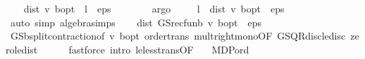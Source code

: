 \begin{isabellebody}
\ \ \isamarkupfalse%
\ {\isachardoublequoteopen}dist\ v\ {\isasymnu}\isactrlsub b{\isacharunderscore}{\kern0pt}opt\ {\isacharasterisk}{\kern0pt}\ l\ {\isacharless}{\kern0pt}\ eps\ {\isacharslash}{\kern0pt}\ {}{\isachardoublequoteclose}\isanewline
\ \ \ \ \isamarkupfalse%
\ argo\isanewline
\ \ \isamarkupfalse%
\ {\isacharasterisk}{\kern0pt}{\isacharcolon}{\kern0pt}\ {\isachardoublequoteopen}l\ {\isacharasterisk}{\kern0pt}\ dist\ v\ {\isasymnu}\isactrlsub b{\isacharunderscore}{\kern0pt}opt\ {\isacharless}{\kern0pt}\ eps\ {\isacharslash}{\kern0pt}\ {}{\isachardoublequoteclose}\isanewline
\ \ \ \ \isamarkupfalse%
\ {\isacharparenleft}{\kern0pt}auto\ simp{\isacharcolon}{\kern0pt}\ algebra{\isacharunderscore}{\kern0pt}simps{\isacharparenright}{\kern0pt}\isanewline
\ \ \isamarkupfalse%
\ {\isachardoublequoteopen}dist\ {\isacharparenleft}{\kern0pt}GS{\isacharunderscore}{\kern0pt}rec{\isacharunderscore}{\kern0pt}fun\isactrlsub b\ v{\isacharparenright}{\kern0pt}\ {\isasymnu}\isactrlsub b{\isacharunderscore}{\kern0pt}opt\ {\isacharless}{\kern0pt}\ eps\ {\isacharslash}{\kern0pt}\ {}{\isachardoublequoteclose}\isanewline
\ \ \ \ \isamarkupfalse%
\ GS{\isachardot}{\kern0pt}{\isasymL}\isactrlsub b{\isacharunderscore}{\kern0pt}split{\isacharunderscore}{\kern0pt}contraction{\isacharbrackleft}{\kern0pt}of\ v\ {\isasymnu}\isactrlsub b{\isacharunderscore}{\kern0pt}opt{\isacharbrackright}{\kern0pt}\ order{\isachardot}{\kern0pt}trans\ mult{\isacharunderscore}{\kern0pt}right{\isacharunderscore}{\kern0pt}mono{\isacharbrackleft}{\kern0pt}OF\ GS{\isacharunderscore}{\kern0pt}QR{\isacharunderscore}{\kern0pt}disc{\isacharunderscore}{\kern0pt}le{\isacharunderscore}{\kern0pt}disc\ zero{\isacharunderscore}{\kern0pt}le{\isacharunderscore}{\kern0pt}dist{\isacharbrackright}{\kern0pt}\isanewline
\ \ \ \ \isamarkupfalse%
\ {\isacharparenleft}{\kern0pt}fastforce\ intro{\isacharbang}{\kern0pt}{\isacharcolon}{\kern0pt}\ le{\isacharunderscore}{\kern0pt}less{\isacharunderscore}{\kern0pt}trans{\isacharbrackleft}{\kern0pt}OF\ {\isacharunderscore}{\kern0pt}\ {\isacharasterisk}{\kern0pt}{\isacharbrackright}{\kern0pt}{\isacharparenright}{\kern0pt}\isanewline
{}\isamarkupfalse%
%
\endisatagproof
{\isafoldproof}%
%
\isadelimproof
\isanewline
%
\endisadelimproof
{}\isamarkupfalse%
\isanewline
\isanewline
{}\isamarkupfalse%
\ MDP{\isacharunderscore}{\kern0pt}ord\ \isanewline
{}\ \ \ \ \ \ \ \isanewline

\end{isabellebody}
